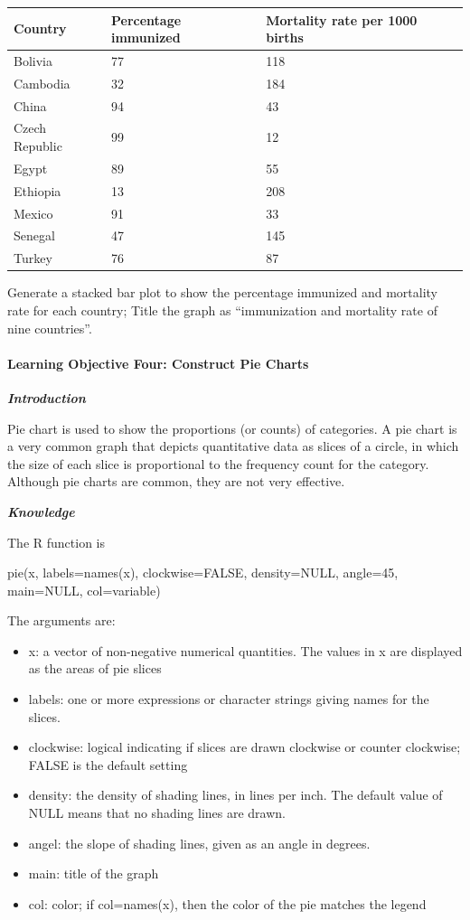 \begin{longtable}[]{@{}lll@{}}
\toprule
Country & Percentage immunized & Mortality rate per 1000
births\tabularnewline
\midrule
\endhead
Bolivia & 77 & 118\tabularnewline
Cambodia & 32 & 184\tabularnewline
China & 94 & 43\tabularnewline
Czech Republic & 99 & 12\tabularnewline
Egypt & 89 & 55\tabularnewline
Ethiopia & 13 & 208\tabularnewline
Mexico & 91 & 33\tabularnewline
Senegal & 47 & 145\tabularnewline
Turkey & 76 & 87\tabularnewline
\bottomrule
\end{longtable}

Generate a stacked bar plot to show the percentage immunized and
mortality rate for each country; Title the graph as ``immunization and
mortality rate of nine countries''.

\hypertarget{learning-objective-four-construct-pie-charts}{%
\paragraph{Learning Objective Four: Construct Pie
Charts}\label{learning-objective-four-construct-pie-charts}}

\emph{\textbf{Introduction}}

Pie chart is used to show the proportions (or counts) of categories. A
pie chart is a very common graph that depicts quantitative data as
slices of a circle, in which the size of each slice is proportional to
the frequency count for the category. Although pie charts are common,
they are not very effective.

\emph{\textbf{Knowledge}}

The R function is

pie(x, labels=names(x), clockwise=FALSE, density=NULL, angle=45,
main=NULL, col=variable)

The arguments are:

\begin{itemize}
\item
  x: a vector of non-negative numerical quantities. The values in x are
  displayed as the areas of pie slices
\item
  labels: one or more expressions or character strings giving names for
  the slices.
\item
  clockwise: logical indicating if slices are drawn clockwise or counter
  clockwise; FALSE is the default setting
\item
  density: the density of shading lines, in lines per inch. The default
  value of NULL means that no shading lines are drawn.
\item
  angel: the slope of shading lines, given as an angle in degrees.
\item
  main: title of the graph
\item
  col: color; if col=names(x), then the color of the pie matches the
  legend
\end{itemize}

